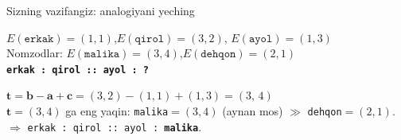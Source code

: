 \documentclass[aspectratio=169,11pt]{beamer}
\begin{document}
\begin{frame}{Sizning vazifangiz: analogiyani yeching}
  \begin{tcolorbox}[warnbox,title=Savol --- 2 daqiqa]
    \small
    $E(\texttt{erkak})=(1,1)$,\quad $E(\texttt{qirol})=(3,2)$,\quad
    $E(\texttt{ayol})=(1,3)$\\[3pt]
    Nomzodlar: $E(\texttt{malika})=(3,4)$,\quad $E(\texttt{dehqon})=(2,1)$\\[5pt]
    \textbf{\large \texttt{erkak : qirol :: ayol : ?}}
  \end{tcolorbox}
  \pause
  \begin{tcolorbox}[okbox,title=Javob]
    \small
    $\mathbf{t}=\mathbf{b}-\mathbf{a}+\mathbf{c}
      = (3,2)-(1,1)+(1,3) = (3,\,4)$\\[3pt]
    $\mathbf{t}=(3,4)$ ga eng yaqin: \texttt{malika}$=(3,4)$ (aynan mos)
    $\gg$ \texttt{dehqon}$=(2,1)$.\\[3pt]
    $\Rightarrow$ \texttt{erkak : qirol :: ayol : \textbf{malika}}.
  \end{tcolorbox}
\end{frame}
\end{document}
